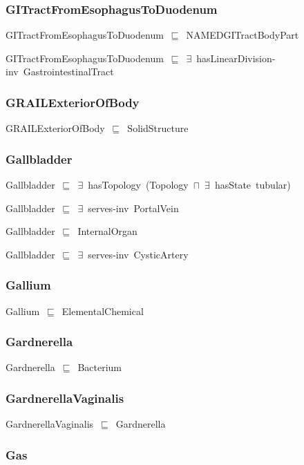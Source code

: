 \documentclass{article}
\begin{document}
\subsubsection*{GITractFromEsophagusToDuodenum}

GITractFromEsophagusToDuodenum~\ensuremath{\sqsubseteq}~NAMEDGITractBodyPart~

GITractFromEsophagusToDuodenum~\ensuremath{\sqsubseteq}~\ensuremath{\exists}~hasLinearDivision-inv~GastrointestinalTract~

\subsubsection*{GRAILExteriorOfBody}

GRAILExteriorOfBody~\ensuremath{\sqsubseteq}~SolidStructure~

\subsubsection*{Gallbladder}

Gallbladder~\ensuremath{\sqsubseteq}~\ensuremath{\exists}~hasTopology~(Topology~\ensuremath{\sqcap}~\ensuremath{\exists}~hasState~tubular)~

Gallbladder~\ensuremath{\sqsubseteq}~\ensuremath{\exists}~serves-inv~PortalVein~

Gallbladder~\ensuremath{\sqsubseteq}~InternalOrgan~

Gallbladder~\ensuremath{\sqsubseteq}~\ensuremath{\exists}~serves-inv~CysticArtery~

\subsubsection*{Gallium}

Gallium~\ensuremath{\sqsubseteq}~ElementalChemical~

\subsubsection*{Gardnerella}

Gardnerella~\ensuremath{\sqsubseteq}~Bacterium~

\subsubsection*{GardnerellaVaginalis}

GardnerellaVaginalis~\ensuremath{\sqsubseteq}~Gardnerella~

\subsubsection*{Gas}
\end{document}
